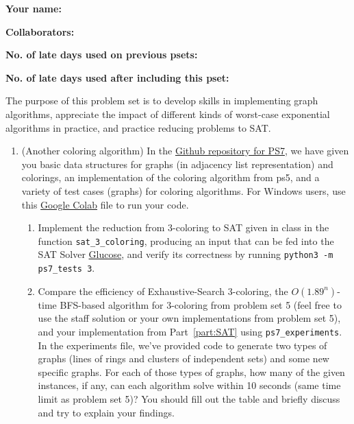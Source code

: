 \documentclass[11pt]{article}
\begin{document}

\textbf{Your name: }

\textbf{Collaborators: }

\textbf{No. of late days used on previous psets: }

\textbf{No. of late days used after including this pset: }


The purpose of this problem set is to develop skills in implementing graph algorithms, appreciate the impact of different kinds of worst-case exponential algorithms in practice, and practice reducing problems to SAT.
\begin{enumerate}

    \item (Another coloring algorithm) 
  In the \href{https://github.com/Harvard-CS-120/cs120/tree/main/fall2022/psets/ps7}{Github repository for PS7}, we have given you basic data structures for graphs (in adjacency list representation) and colorings, an implementation of the coloring algorithm from ps5, and a variety of test cases (graphs) for coloring algorithms. For Windows users, use this \href{https://colab.research.google.com/drive/13nMhNMaDstVaEkxye61m8AV7nk9ks9uS#scrollTo=AbIalcylVVuu}{Google Colab} file to run your code.
  
  \begin{enumerate}      
      \item Implement the reduction from 3-coloring to SAT given in class in the function \texttt{sat\_3\_coloring}, producing an input that can be fed into the SAT Solver \href{https://www.labri.fr/perso/lsimon/glucose/}{Glucose}, and verify its correctness by running \texttt{python3 -m ps7\_tests 3}. \label{part:SAT}
      \item Compare the efficiency of Exhaustive-Search 3-coloring, the $O(1.89^n)$-time BFS-based algorithm for 3-coloring from problem set 5 (feel free to use the staff solution or your own implementations from problem set 5), and your implementation from  Part~\ref{part:SAT} using \texttt{ps7\_experiments}. In the experiments file, we've provided code to generate two types of graphs (lines of rings and clusters of independent sets) and some new specific graphs. For each of those types of graphs, how many of the given instances, if any, can each algorithm solve within 10 seconds (same time limit as problem set 5)? You should fill out the table and briefly discuss and try to explain your findings.


\end{enumerate}
\end{enumerate}
\end{document}
